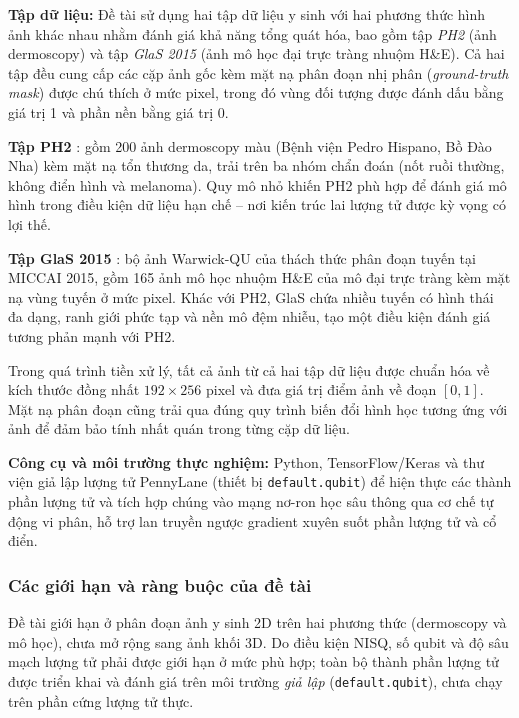 \documentclass[14pt]{article}  %
\begin{document}
{    \textbf{Tập dữ liệu:} Đề tài sử dụng hai tập dữ liệu y sinh với hai phương thức hình ảnh khác nhau nhằm đánh giá khả năng tổng quát hóa, bao gồm tập \textit{PH2} (ảnh dermoscopy) và tập \textit{GlaS 2015} (ảnh mô học đại trực tràng nhuộm H\&E). Cả hai tập đều cung cấp các cặp ảnh gốc kèm mặt nạ phân đoạn nhị phân (\textit{ground-truth mask}) được chú thích ở mức pixel, trong đó vùng đối tượng được đánh dấu bằng giá trị 1 và phần nền bằng giá trị 0.

    \textbf{Tập PH2} \cite{mendonca2013ph2}: gồm 200 ảnh dermoscopy màu (Bệnh viện Pedro Hispano, Bồ Đào Nha) kèm mặt nạ tổn thương da, trải trên ba nhóm chẩn đoán (nốt ruồi thường, không điển hình và melanoma). Quy mô nhỏ khiến PH2 phù hợp để đánh giá mô hình trong điều kiện dữ liệu hạn chế -- nơi kiến trúc lai lượng tử được kỳ vọng có lợi thế.

    \textbf{Tập GlaS 2015} \cite{sirinukunwattana2017glas}: bộ ảnh Warwick-QU của thách thức phân đoạn tuyến tại MICCAI 2015, gồm 165 ảnh mô học nhuộm H\&E của mô đại trực tràng kèm mặt nạ vùng tuyến ở mức pixel. Khác với PH2, GlaS chứa nhiều tuyến có hình thái đa dạng, ranh giới phức tạp và nền mô đệm nhiễu, tạo một điều kiện đánh giá tương phản mạnh với PH2.

    Trong quá trình tiền xử lý, tất cả ảnh từ cả hai tập dữ liệu được chuẩn hóa về kích thước đồng nhất $192 \times 256$ pixel và đưa giá trị điểm ảnh về đoạn $[0,1]$. Mặt nạ phân đoạn cũng trải qua đúng quy trình biến đổi hình học tương ứng với ảnh để đảm bảo tính nhất quán trong từng cặp dữ liệu.

    \textbf{Công cụ và môi trường thực nghiệm:} Python, TensorFlow/Keras và thư viện giả lập lượng tử PennyLane (thiết bị \texttt{default.qubit}) để hiện thực các thành phần lượng tử và tích hợp chúng vào mạng nơ-ron học sâu thông qua cơ chế tự động vi phân, hỗ trợ lan truyền ngược gradient xuyên suốt phần lượng tử và cổ điển.

    \subsubsection{Các giới hạn và ràng buộc của đề tài}

    Đề tài giới hạn ở phân đoạn ảnh y sinh 2D trên hai phương thức (dermoscopy và mô học), chưa mở rộng sang ảnh khối 3D. Do điều kiện NISQ, số qubit và độ sâu mạch lượng tử phải được giới hạn ở mức phù hợp; toàn bộ thành phần lượng tử được triển khai và đánh giá trên môi trường \emph{giả lập} (\texttt{default.qubit}), chưa chạy trên phần cứng lượng tử thực.

}
\end{document}

